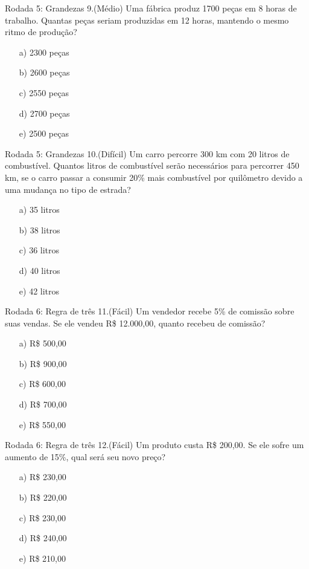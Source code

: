 \documentclass{beamer}
\begin{document}
\begin{frame}{Rodada 5: Grandezas }
    9.(Médio) Uma fábrica produz 1700 peças em 8 horas de trabalho. Quantas peças seriam produzidas em 12 horas, mantendo o mesmo ritmo de produção?
    \begin{itemize}
        \item[a)] 2300 peças
        \item[b)] 2600 peças
        \item[c)] \alert<2>{2550 peças}
        \item[d)] 2700 peças
        \item[e)] 2500 peças
    \end{itemize}
\end{frame}

\begin{frame}{Rodada 5: Grandezas }
    10.(Difícil) Um carro percorre 300 km com 20 litros de combustível. Quantos litros de combustível serão necessários
    para percorrer 450 km, se o carro passar a consumir 20\% mais combustível por quilômetro devido a uma mudança no tipo de estrada?

\begin{itemize}
\item[a)] 35 litros
\item[b)] 38 litros
\item[c)] \alert<2>{36 litros}
\item[d)] 40 litros
\item[e)] 42 litros
\end{itemize}
\end{frame}

\begin{frame}{Rodada 6: Regra de três }
    11.(Fácil) Um vendedor recebe 5\% de comissão sobre suas vendas. Se ele vendeu R\$ 12.000,00, quanto recebeu de comissão?

\begin{itemize}
    \item[a)] R\$ 500,00
    \item[b)] R\$ 900,00
    \item[c)] \alert<2>{R\$ 600,00}
    \item[d)] R\$ 700,00
    \item[e)] R\$ 550,00
\end{itemize}

\end{frame}


\begin{frame}{Rodada 6: Regra de três  }
    12.(Fácil) Um produto custa R\$ 200,00. Se ele sofre um aumento de 15\%, qual será seu novo preço?

\begin{itemize}
    \item[a)] R\$ 230,00
    \item[b)] R\$ 220,00
    \item[c)] \alert<2>{R\$ 230,00}
    \item[d)] R\$ 240,00
    \item[e)] R\$ 210,00
\end{itemize}
\end{frame}
\end{document}
